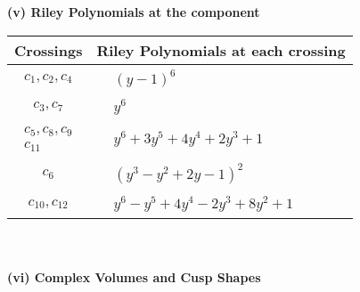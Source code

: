 \documentclass[1p]{elsarticle_modified}
\theoremstyle{definition}
\begin{document}
\newpage\renewcommand{\arraystretch}{1}
\flushleft \textbf{(v) Riley Polynomials at the component}\newline \\
\begin{tabular}{m{50pt}|m{274pt}}
Crossings & \hspace{64pt}Riley Polynomials at each crossing \\
\hline $$\begin{aligned}c_{1},c_{2},c_{4}\end{aligned}$$&$\begin{aligned}
&(y-1)^6
\end{aligned}$\\
\hline $$\begin{aligned}c_{3},c_{7}\end{aligned}$$&$\begin{aligned}
&y^6
\end{aligned}$\\
\hline $$\begin{aligned}c_{5},c_{8},c_{9}\\c_{11}\end{aligned}$$&$\begin{aligned}
&y^6+3 y^5+4 y^4+2 y^3+1
\end{aligned}$\\
\hline $$\begin{aligned}c_{6}\end{aligned}$$&$\begin{aligned}
&(y^3- y^2+2 y-1)^2
\end{aligned}$\\
\hline $$\begin{aligned}c_{10},c_{12}\end{aligned}$$&$\begin{aligned}
&y^6- y^5+4 y^4-2 y^3+8 y^2+1
\end{aligned}$\\
\hline
\end{tabular}\\~\\
\newpage\flushleft \textbf{(vi) Complex Volumes and Cusp Shapes}
\end{document}
